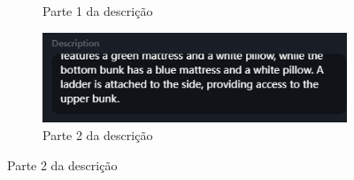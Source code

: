 \begin{figure}[htbp]
\begin{subfigure}{0.4\linewidth}
        \caption{\small Parte 1 da descrição}
        \label{fig:viduReferenciaCama1}
    \end{subfigure}
    \begin{subfigure}{0.45\linewidth}
        \includegraphics[width=1\linewidth]{figs/vidu/tela_referencia_beliche2.PNG}
        \caption{\small Parte 2 da descrição}
        \label{fig:viduReferenciaCama2}
    \end{subfigure}
\end{figure}


